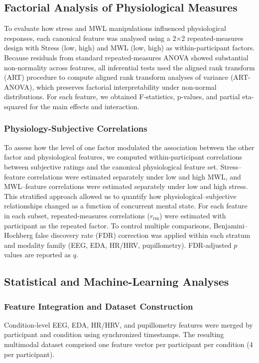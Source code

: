 \documentclass[lettersize,journal]{IEEEtran}
\begin{document}
\subsection{Factorial Analysis of Physiological Measures}

To evaluate how stress and MWL manipulations influenced physiological responses, each canonical feature was analysed using a 2×2 repeated-measures design with Stress (low, high) and MWL (low, high) as within-participant factors. Because residuals from standard repeated-measures ANOVA showed substantial non-normality across features, all inferential tests used the aligned rank transform (ART) procedure to compute aligned rank transform analyses of variance (ART-ANOVA), which preserves factorial interpretability under non-normal distributions. For each feature, we obtained F-statistics, p-values, and partial eta-squared for the main effects and interaction.


\subsubsection{Physiology-Subjective Correlations}

To assess how the level of one factor modulated the association between the other factor and physiological features, we computed within-participant correlations between subjective ratings and the canonical physiological feature set. Stress–feature correlations were estimated separately under low and high MWL, and MWL–feature correlations were estimated separately under low and high stress. This stratified approach allowed us to quantify how physiological–subjective relationships changed as a function of concurrent mental state. For each feature in each subset, repeated-measures correlations ($r_{\mathrm{rm}}$) were estimated with participant as the repeated factor. To control multiple comparisons, Benjamini–Hochberg false discovery rate (FDR) correction was applied within each stratum and modality family (EEG, EDA, HR/HRV, pupillometry). FDR-adjusted $p$ values are reported as $q$.


\subsection{Statistical and Machine-Learning Analyses}

\subsubsection{Feature Integration and Dataset Construction}
Condition-level EEG, EDA, HR/HRV, and pupillometry features were merged by participant and condition using synchronized timestamps. The resulting multimodal dataset comprised one feature vector per participant per condition (4 per participant).
\end{document}
